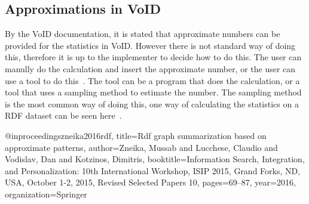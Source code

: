 \subsection{Approximations in VoID} \label{sec:approximations}
By the VoID  documentation, it is stated that approximate numbers can be provided for the statistics in VoID. However there is not standard way of doing this, therefore it is up to the implementer to decide how to do this. The user can manully do the calculation and insert the approximate number, or the user can use a tool to do this~\cite{the-web-of-data}. The tool can be a program that does the calculation, or a tool that uses a sampling method to estimate the number. The sampling method is the most common way of doing this, one way of calculating the statistics on a RDF dataset can be seen here~\cite{zneika2016rd}.

@inproceedings{zneika2016rdf,
    title={Rdf graph summarization based on approximate patterns},
    author={Zneika, Mussab and Lucchese, Claudio and Vodislav, Dan and Kotzinos, Dimitris},
    booktitle={Information Search, Integration, and Personalization: 10th International Workshop, ISIP 2015, Grand Forks, ND, USA, October 1-2, 2015, Revised Selected Papers 10},
    pages={69--87},
    year={2016},
    organization={Springer}
}